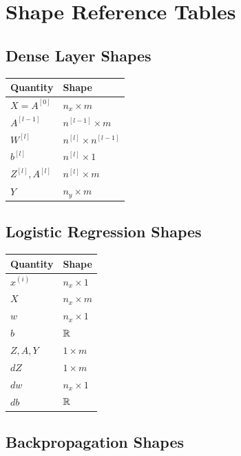 \section{Shape Reference Tables}

\subsection{Dense Layer Shapes}

\begin{center}
\begin{tabular}{ll}
\toprule
Quantity & Shape \\
\midrule
$X=A^{[0]}$ & $n_x \times m$ \\
$A^{[l-1]}$ & $n^{[l-1]} \times m$ \\
$W^{[l]}$ & $n^{[l]} \times n^{[l-1]}$ \\
$b^{[l]}$ & $n^{[l]} \times 1$ \\
$Z^{[l]},A^{[l]}$ & $n^{[l]} \times m$ \\
$Y$ & $n_y \times m$ \\
\bottomrule
\end{tabular}
\end{center}

\subsection{Logistic Regression Shapes}

\begin{center}
\begin{tabular}{ll}
\toprule
Quantity & Shape \\
\midrule
$x^{(i)}$ & $n_x \times 1$ \\
$X$ & $n_x \times m$ \\
$w$ & $n_x \times 1$ \\
$b$ & $\mathbb{R}$ \\
$Z,A,Y$ & $1 \times m$ \\
$dZ$ & $1 \times m$ \\
$dw$ & $n_x \times 1$ \\
$db$ & $\mathbb{R}$ \\
\bottomrule
\end{tabular}
\end{center}

\subsection{Backpropagation Shapes}

